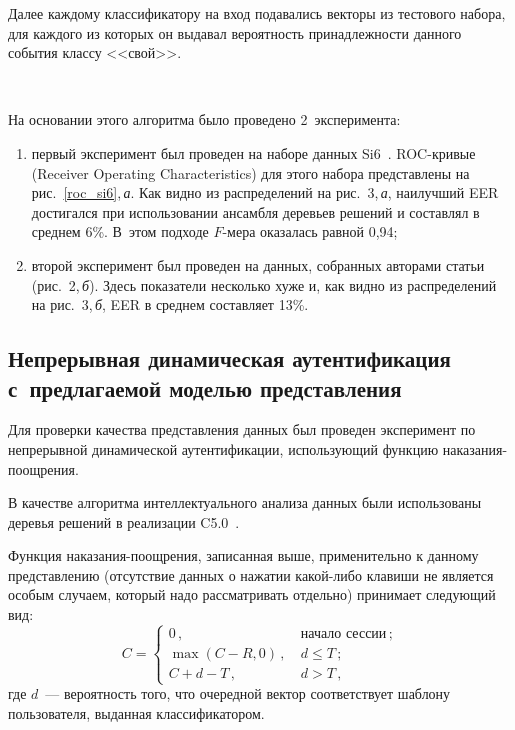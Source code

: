 \begin{multicols}{2}
Далее каждому классификатору на вход подавались векторы из тестового
набора, для каждого из которых он выдавал вероятность принадлежности
данного события классу <<свой>>.

\setcounter{figure}{2}
\begin{figure*} %
\vspace*{9pt}
 \begin{center}
 \mbox{%
 \epsfxsize=162.085mm
 }
 \end{center}
 \vspace*{-6pt}
    \label{eer_si6}
\end{figure*}

На основании этого алгоритма было проведено 2~эксперимента:
\begin{enumerate}[(1)]
\item первый эксперимент был проведен на наборе 
данных Si6~\cite{si6}. ROC-кри\-вые (Receiver Operating Characteristics)
для этого набора представлены на рис.~\ref{roc_si6},\,\textit{а}. 
Как видно из распределений на рис.~3,\,\textit{а}, наилучший EER достигался при 
использовании ансамбля деревьев решений и составлял в среднем 6\%.  В~этом 
подходе $F$-ме\-ра оказалась равной 0,94;
\item второй эксперимент был проведен на данных, собранных авторами статьи 
(рис.~2,\,\textit{б}). Здесь показатели несколько хуже и, как видно из распределений 
на рис.~3,\,\textit{б}, EER в среднем составляет 13\%.
\end{enumerate}

\subsection{Непрерывная динамическая аутентификация с~предлагаемой моделью представления}

Для проверки качества представления данных был проведен эксперимент
по непрерывной динамической аутентификации, использующий функцию
на\-ка\-за\-ния-поощре\-ния.

В качестве алгоритма интеллектуального анализа данных были
использованы деревья решений в реализации C5.0~\cite{c50}.

Функция наказания-поощрения, записанная выше, применительно к
данному представлению (отсутствие данных о нажатии какой-либо
клавиши не является особым случаем, который надо рас\-смат\-ри\-вать
отдельно) принимает следующий вид:
$$ C =
\begin{cases}
    0\,, &\ \mbox{начало\ сессии}\,; \\
    \max(C - R, 0)\,, &\ d \le T\,; \\
    C + d - T\,, &\ d > T\,,
\end{cases}
$$
где $d$~--- вероятность того, что очередной вектор соответствует шаблону 
пользователя, выданная классификатором.


\end{multicols}

